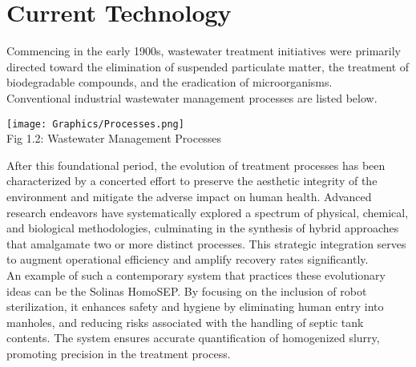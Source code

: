 \documentclass[a4,10pt]{report}
\begin{document}
\section{Current Technology}
Commencing in the early 1900s, wastewater treatment initiatives were primarily directed toward the elimination of suspended particulate matter, the treatment of biodegradable compounds, and the eradication of microorganisms.
\vspace{2mm} \\
Conventional industrial wastewater management processes are listed below.
\begin{center}
    \texttt{[image: Graphics/Processes.png]} \\
    Fig 1.2: Wastewater Management Processes \\
\end{center}

After this foundational period, the evolution of treatment processes has been characterized by a concerted effort to preserve the aesthetic integrity of the environment and mitigate the adverse impact on human health. Advanced research endeavors have systematically explored a spectrum of physical, chemical, and biological methodologies, culminating in the synthesis of hybrid approaches that amalgamate two or more distinct processes. This strategic integration serves to augment operational efficiency and amplify recovery rates significantly.
\vspace{2mm} \\
An example of such a contemporary system that practices these evolutionary ideas can be the Solinas HomoSEP. By focusing on the inclusion of robot sterilization, it enhances safety and hygiene by eliminating human entry into manholes, and reducing risks associated with the handling of septic tank contents. The system ensures accurate quantification of homogenized slurry, promoting precision in the treatment process.\cite{homosep}
\end{document}
